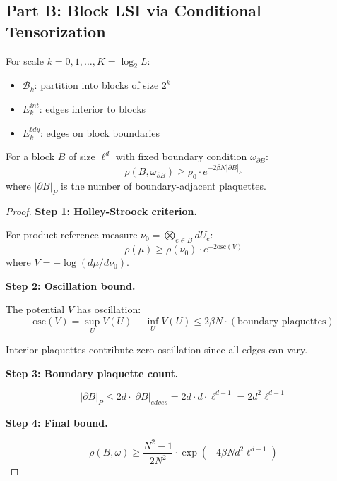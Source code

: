 \subsection{Part B: Block LSI via Conditional Tensorization}

\begin{definition}
\label{def:block-decomp}
For scale $k = 0, 1, \ldots, K = \log_2 L$:
\begin{itemize}
\item $\mathcal{B}_k$: partition into blocks of size $2^k$
\item $E_k^{int}$: edges interior to blocks
\item $E_k^{bdy}$: edges on block boundaries
\end{itemize}
\end{definition}

\begin{theorem}
\label{thm:block-interior-lsi}
For a block $B$ of size $\ell^d$ with fixed boundary condition $\omega_{\partial B}$:
\begin{equation}
\rho(B, \omega_{\partial B}) \geq \rho_0 \cdot e^{-2\beta N |\partial B|_P}
\end{equation}
where $|\partial B|_P$ is the number of boundary-adjacent plaquettes.
\end{theorem}

\begin{proof}
\textbf{Step 1: Holley-Stroock criterion.}

For product reference measure $\nu_0 = \bigotimes_{e \in B} dU_e$:
\begin{equation}
\rho(\mu) \geq \rho(\nu_0) \cdot e^{-2 \mathrm{osc}(V)}
\end{equation}
where $V = -\log(d\mu/d\nu_0)$.

\textbf{Step 2: Oscillation bound.}

The potential $V$ has oscillation:
\begin{equation}
\mathrm{osc}(V) = \sup_U V(U) - \inf_U V(U) \leq 2\beta N \cdot (\text{boundary plaquettes})
\end{equation}

Interior plaquettes contribute zero oscillation since all edges can vary.

\textbf{Step 3: Boundary plaquette count.}

\begin{equation}
|\partial B|_P \leq 2d \cdot |\partial B|_{edges} = 2d \cdot d \cdot \ell^{d-1} = 2d^2 \ell^{d-1}
\end{equation}

\textbf{Step 4: Final bound.}

\begin{equation}
\rho(B, \omega) \geq \frac{N^2-1}{2N^2} \cdot \exp\left(-4\beta N d^2 \ell^{d-1}\right)
\end{equation}
\end{proof}

